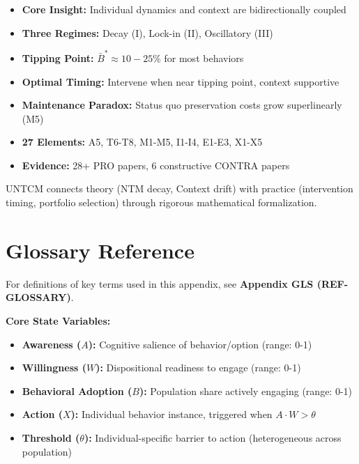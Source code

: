 \begin{itemize}[nosep]
    \item \textbf{Core Insight:} Individual dynamics and context are bidirectionally coupled
    \item \textbf{Three Regimes:} Decay (I), Lock-in (II), Oscillatory (III)
    \item \textbf{Tipping Point:} $\bar{B}^* \approx 10-25\%$ for most behaviors
    \item \textbf{Optimal Timing:} Intervene when near tipping point, context supportive
    \item \textbf{Maintenance Paradox:} Status quo preservation costs grow superlinearly (M5)
    \item \textbf{27 Elements:} A5, T6-T8, M1-M5, I1-I4, E1-E3, X1-X5
    \item \textbf{Evidence:} 28+ PRO papers, 6 constructive CONTRA papers
\end{itemize}

UNTCM connects theory (NTM decay, Context drift) with practice (intervention timing, portfolio selection) through rigorous mathematical formalization.

\section{Glossary Reference}
\label{sec:untcm-glossary}

For definitions of key terms used in this appendix, see \textbf{Appendix GLS (REF-GLOSSARY)}.

\textbf{Core State Variables:}
\begin{itemize}[nosep]
    \item \textbf{Awareness ($A$):} Cognitive salience of behavior/option (range: 0-1)
    \item \textbf{Willingness ($W$):} Dispositional readiness to engage (range: 0-1)
    \item \textbf{Behavioral Adoption ($B$):} Population share actively engaging (range: 0-1)
    \item \textbf{Action ($X$):} Individual behavior instance, triggered when $A \cdot W > \theta$
    \item \textbf{Threshold ($\theta$):} Individual-specific barrier to action (heterogeneous across population)
\end{itemize}

